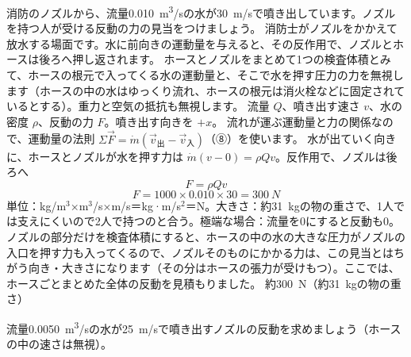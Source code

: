 \begin{phreidai}[消防のノズルの反動]
\label{ph:力-13:ex10}消防のノズルから、流量\qty{0.010}{m^3/s}の水が\qty{30}{m/s}で噴き出しています。ノズルを持つ人が受ける反動の力の見当をつけましょう。
\phbamen
消防士がノズルをかかえて放水する場面です。水に前向きの運動量を与えると、その反作用で、ノズルとホースは後ろへ押し返されます。
\phmushi
ホースとノズルをまとめて1つの検査体積とみて、ホースの根元で入ってくる水の運動量と、そこで水を押す圧力の力を無視します（ホースの中の水はゆっくり流れ、ホースの根元は消火栓などに固定されているとする）。重力と空気の抵抗も無視します。
\phzu
流量 $Q$、噴き出す速さ $v$、水の密度 $\rho$、反動の力 $F$。噴き出す向きを $+x$。
\phriyu
流れが運ぶ運動量と力の関係なので、運動量の法則 $\Sigma\vec F=\dot m(\vec v_{\text{出}}-\vec v_{\text{入}})$（⑧）を使います。
\phtateru
水が出ていく向きに、ホースとノズルが水を押す力は $\dot m(v-0)=\rho Qv$。反作用で、ノズルは後ろへ
\[ F=\rho Qv \]
\phtoku
\[ F=1000\times0.010\times30=\qty{300}{N} \]
\phtashikame
単位：kg/m$^3$×m$^3$/s×m/s＝kg·m/s$^2$＝N。大きさ：約\qty{31}{kg}の物の重さで、1人では支えにくいので2人で持つのと合う。極端な場合：流量を0にすると反動も0。
ノズルの部分だけを検査体積にすると、ホースの中の水の大きな圧力がノズルの入口を押す力も入ってくるので、ノズルそのものにかかる力は、この見当とはちがう向き・大きさになります（その分はホースの張力が受けもつ）。ここでは、ホースごとまとめた全体の反動を見積もりました。
\kotae 約\qty{300}{N}（約\qty{31}{kg}の物の重さ）
\end{phreidai}
\begin{jibun}
流量\qty{0.0050}{m^3/s}の水が\qty{25}{m/s}で噴き出すノズルの反動を求めましょう（ホースの中の速さは無視）。
\end{jibun}

